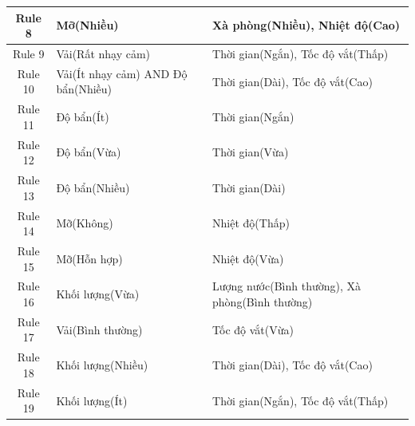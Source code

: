 \documentclass[12pt, a4paper]{article}
\begin{document}
\begin{table}[H]
{\begin{tabular}{|c|p{7cm}|p{8cm}|}
        \hline
        Rule 8 & Mỡ(Nhiều) & Xà phòng(Nhiều), Nhiệt độ(Cao) \\
        \hline
        Rule 9 & Vải(Rất nhạy cảm) & Thời gian(Ngắn), Tốc độ vắt(Thấp) \\
        \hline
        Rule 10 & Vải(Ít nhạy cảm) AND Độ bẩn(Nhiều) & Thời gian(Dài), Tốc độ vắt(Cao) \\
        \hline
        Rule 11 & Độ bẩn(Ít) & Thời gian(Ngắn) \\
        \hline
        Rule 12 & Độ bẩn(Vừa) & Thời gian(Vừa) \\
        \hline
        Rule 13 & Độ bẩn(Nhiều) & Thời gian(Dài) \\
        \hline
        Rule 14 & Mỡ(Không) & Nhiệt độ(Thấp) \\
        \hline
        Rule 15 & Mỡ(Hỗn hợp) & Nhiệt độ(Vừa) \\
        \hline
        Rule 16 & Khối lượng(Vừa) & Lượng nước(Bình thường), Xà phòng(Bình thường) \\
        \hline
        Rule 17 & Vải(Bình thường) & Tốc độ vắt(Vừa) \\
        \hline
        Rule 18 & Khối lượng(Nhiều) & Thời gian(Dài), Tốc độ vắt(Cao) \\
        \hline
        Rule 19 & Khối lượng(Ít) & Thời gian(Ngắn), Tốc độ vắt(Thấp) \\
        \hline
    \end{tabular}
    }
\end{table}
\end{document}
